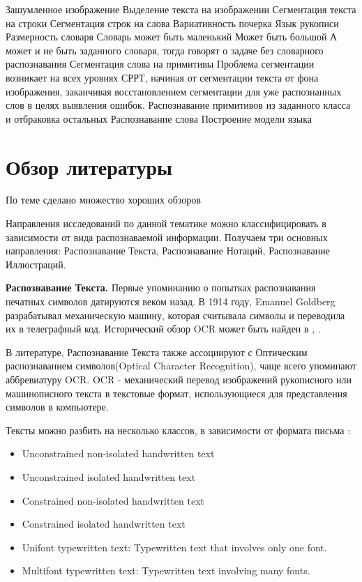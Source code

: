 Зашумленное изображение
Выделение текста на изображении
Сегментация текста на строки
Сегментация строк на слова
Вариативность почерка
Язык рукописи
Размерность словаря
Словарь может быть маленький
Может быть большой
А может и не быть заданного словаря, тогда говорят о задаче без словарного распознавания 
Сегментация слова на примитивы
Проблема сегментации возникает на всех уровнях СРРТ, начиная от сегментации текста от фона изображения, заканчивая восстановлением сегментации для уже распознанных слов в целях выявления ошибок.
Распознавание примитивов из заданного класса и отбраковка остальных
Распознавание слова
Построение модели языка

\section*{Обзор литературы}

По теме сделано множество хороших обзоров \cite{bunke2003recognition, plotz2009markov, rehman2012off, fujisawa2008forty, plamondon2000online, steinherz1999offline, vinciarelli2002survey}

Направления исследований по данной тематике можно классифицировать в зависимости от вида распознаваемой информации. Получаем три основных направления: Распознавание Текста, Распознавание Нотаций, Распознавание Иллюстраций.

\textbf{Распознавание Текста.} Первые упоминанию о попытках распознавания печатных символов датируются веком назад. В 1914 году, Emanuel Goldberg разрабатывал механическую машину, которая считывала символы и переводила их в телеграфный код. Исторический обзор OCR может быть найден в \cite{mori1992historical}, \cite{herbert1982history}.

В литературе, Распознавание Текста также ассоциируют с Оптическим распознаванием символов(Optical Character Recognition), чаще всего упоминают аббревиатуру OCR. OCR - механический перевод изображений рукописного или машинописного текста в текстовые формат, использующиеся для представления символов в компьютере.

\noindent Тексты можно разбить на несколько классов, в зависимости от формата письма \cite{salunke2015state}:
\begin{itemize}
  \item Unconstrained non-isolated handwritten text
  \item Unconstrained isolated handwritten text
  \item Constrained non-isolated handwritten text
  \item Constrained isolated handwritten text
  \item Unifont typewritten text: Typewritten text that involves only one font.
  \item Multifont typewritten text: Typewritten text involving many fonts.
\end{itemize}

